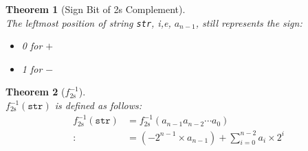 \documentclass[12pt]{article}
\newtheorem{theorem}{Theorem}[section]
\theoremstyle{definition}
\begin{document}
\begin{theorem}[Sign Bit of 2s Complement]
\hfill\\\normalfont The leftmost position of string \texttt{str}, i,e, $a_{n-1}$, still represents the sign:
\begin{itemize}
  \item 0 for $+$
  \item 1 for $-$
\end{itemize}
\end{theorem}
\begin{theorem}[$f^{-1}_\text{2s}$]
\hfill\\\normalfont $f^{-1}_\text{2s}(\texttt{str})$ is defined as follows:
\begin{align*}
f^{-1}_\text{2s}(\texttt{str})&=f^{-1}_\text{2s}(a_{n-1}a_{n-2}\cdots a_0)\\
:&=(-2^{n-1}\times a_{n-1})+\sum_{i=0}^{n-2}a_i\times 2^i
\end{align*}
\end{theorem}
\end{document}
